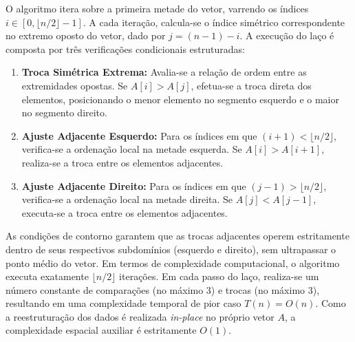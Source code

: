 \documentclass[portuguese]{sbc2025}%
\begin{document}
O algoritmo itera sobre a primeira metade do vetor, varrendo os índices $i \in [0, \lfloor n/2 \rfloor - 1]$. A cada iteração, calcula-se o índice simétrico correspondente no extremo oposto do vetor, dado por $j = (n - 1) - i$. A execução do laço é composta por três verificações condicionais estruturadas:

\begin{enumerate}
    \item \textbf{Troca Simétrica Extrema:} Avalia-se a relação de ordem entre as extremidades opostas. Se $A[i] > A[j]$, efetua-se a troca direta dos elementos, posicionando o menor elemento no segmento esquerdo e o maior no segmento direito.
    \item \textbf{Ajuste Adjacente Esquerdo:} Para os índices em que $(i + 1) < \lfloor n/2 \rfloor$, verifica-se a ordenação local na metade esquerda. Se $A[i] > A[i+1]$, realiza-se a troca entre os elementos adjacentes.
    \item \textbf{Ajuste Adjacente Direito:} Para os índices em que $(j - 1) > \lfloor n/2 \rfloor$, verifica-se a ordenação local na metade direita. Se $A[j] < A[j-1]$, executa-se a troca entre os elementos adjacentes.
\end{enumerate}

As condições de contorno garantem que as trocas adjacentes operem estritamente dentro de seus respectivos subdomínios (esquerdo e direito), sem ultrapassar o ponto médio do vetor. Em termos de complexidade computacional, o algoritmo executa exatamente $\lfloor n/2 \rfloor$ iterações. Em cada passo do laço, realiza-se um número constante de comparações (no máximo 3) e trocas (no máximo 3), resultando em uma complexidade temporal de pior caso $T(n) = O(n)$. Como a reestruturação dos dados é realizada \emph{in-place} no próprio vetor $A$, a complexidade espacial auxiliar é estritamente $O(1)$.
\end{document}
